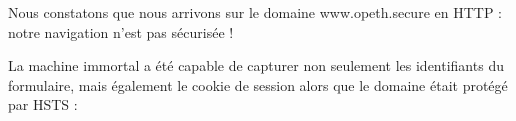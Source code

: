 Nous constatons que nous arrivons sur le domaine www.opeth.secure en HTTP : notre navigation n'est pas sécurisée !

\begin{figure}[H]
\end{figure}

La machine immortal a été capable de capturer non seulement les identifiants du formulaire, mais également le cookie de session alors que le domaine était protégé par HSTS :

\begin{figure}[H]
\end{figure}


